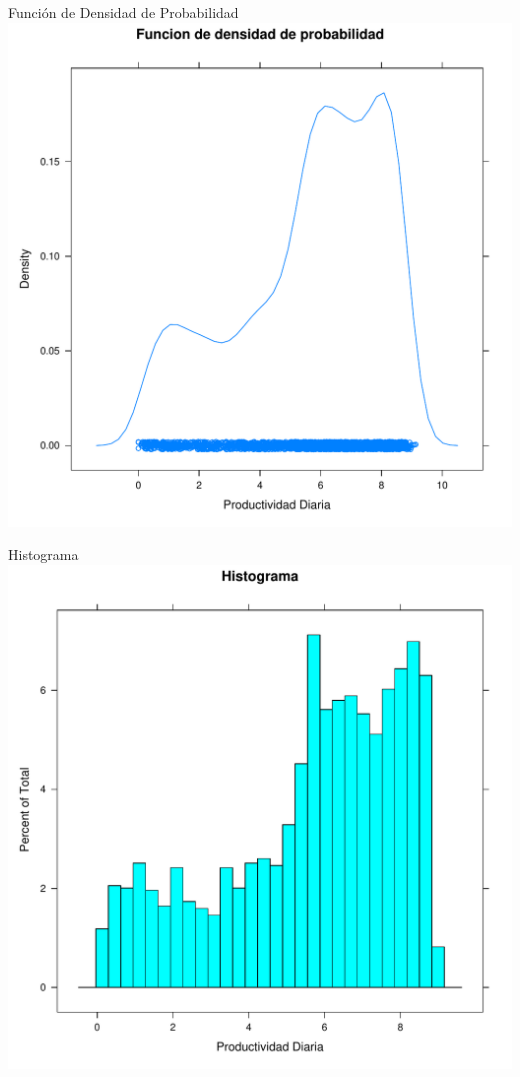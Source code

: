 \documentclass[xcolor={usenames,svgnames,dvipsnames}]{beamer}
\begin{document}
\begin{frame}[label=sec-7-1-3]{Función de Densidad de Probabilidad}
\includegraphics[width=.9\linewidth]{../figs/FuncionDensidadProbabilidad.pdf}
\end{frame}

\begin{frame}[label=sec-7-1-4]{Histograma}
\includegraphics[width=.9\linewidth]{../figs/Histograma.pdf}
\end{frame}
\end{document}
